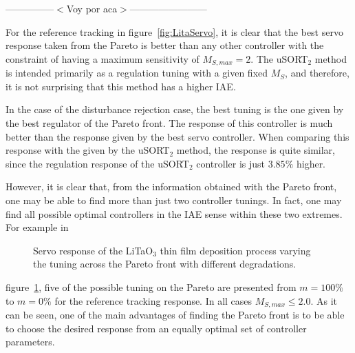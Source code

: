 ---------------$<$Voy por aca$>$------------------------


For the reference tracking in figure~\ref{fig:LitaServo}, it is clear that the best servo response taken from the Pareto is better than any other controller with the constraint of having a maximum sensitivity of $M_{S,max} = 2$. The uSORT$_2$ method is intended primarily as a regulation tuning with a given fixed $M_S$, and therefore, it is not surprising that this method has a higher IAE.

In the case of the disturbance rejection case, the best tuning is the one given by the best regulator of the Pareto front. The response of this controller is much better than the response given by the best servo controller. When comparing this response with the given by the uSORT$_2$ method, the response is quite similar, since the regulation response of the uSORT$_2$ controller is just $3.85\%$ higher.

However, it is clear that, from the information obtained with the Pareto front, one may be able to find more than just two controller tunings. In fact, one may find all possible optimal controllers in the IAE sense within these two extremes. For example in %
%
\begin{figure}[tb]
	\centering
	\caption{Servo response of the LiTaO$_3$ thin film deposition process varying the tuning across the Pareto front with different degradations.}
	\label{fig:LitaServoParetoResp}
\end{figure}
%
figure~\ref{fig:LitaServoParetoResp}, five of the possible tuning on the Pareto are presented from $m=100\%$ to $m=0\%$ for the reference tracking response. In all cases $M_{S,max}\leq 2.0$. As it can be seen, one of the main advantages of finding the Pareto front is to be able to choose the desired response from an equally optimal set of controller parameters.
%
